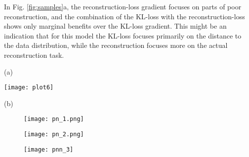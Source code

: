 \documentclass{article}
\begin{document}
In Fig. \ref{fig:samples}a, the reconstruction-loss gradient focuses on parts of poor reconstruction, and the combination of the KL-loss with the reconstruction-loss shows only marginal benefits over the KL-loss gradient. 
This might be an indication that for this model the KL-loss focuses primarily on the distance to the data distribution, while the reconstruction focuses more on the actual reconstruction task. 


\begin{table}[tb]

\begin{minipage}[c]{0.05\linewidth}
(a)
\end{minipage}
\hspace{0.5cm}
\begin{minipage}[c]{0.88\linewidth}
    \centering
          \texttt{[image: plot6]}
\end{minipage}

\begin{minipage}[c]{0.05\linewidth}
(b)
\end{minipage}
\hspace{0.5cm}
\begin{minipage}[c]{0.84\linewidth}
\vspace{1.0em}

    \centering
  \begin{subfigure}[b]{\textwidth}
    \texttt{[image: pn\_1.png]}
  \end{subfigure}
  \begin{subfigure}[b]{\textwidth}
    \texttt{[image: pn\_2.png]}
  \end{subfigure}
  \begin{subfigure}[b]{\textwidth}
    \texttt{[image: pnn\_3]}
  \end{subfigure}
\end{minipage}


\label{fig:samples}
\label{fig:comparison}
\end{table}
\end{document}
